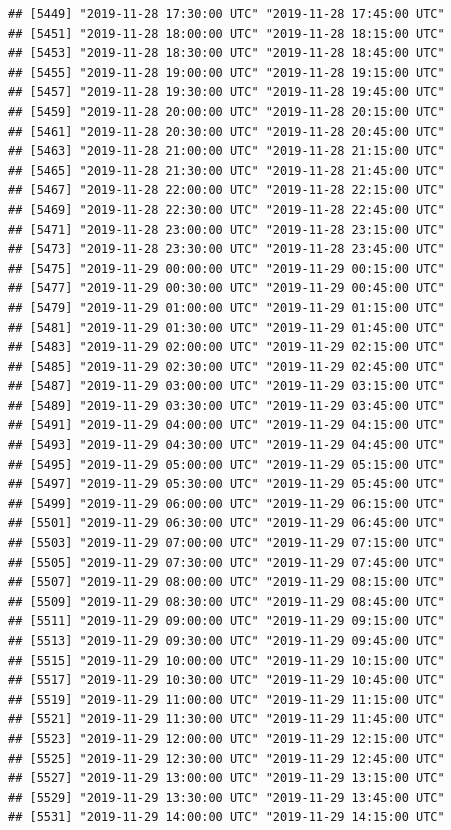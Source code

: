 \documentclass{article}\usepackage[]{graphicx}\usepackage[]{color}
\makeatletter
\newenvironment{kframe}{%
 \def\at@end@of@kframe{}%
 \ifinner\ifhmode%
  \def\at@end@of@kframe{\end{minipage}}%
  \begin{minipage}{\columnwidth}%
 \fi\fi%
 \def\FrameCommand##1{\hskip\@totalleftmargin \hskip-\fboxsep
 \colorbox{shadecolor}{##1}\hskip-\fboxsep
     \hskip-\linewidth \hskip-\@totalleftmargin \hskip\columnwidth}%
 \MakeFramed {\advance\hsize-\width
   \@totalleftmargin\z@ \linewidth\hsize
   \@setminipage}}%
 {\par\unskip\endMakeFramed%
 \at@end@of@kframe}
\newenvironment{knitrout}{}{} %
\makeatother
\begin{document}
\begin{knitrout}
\begin{kframe}
\begin{verbatim}
## [5449] "2019-11-28 17:30:00 UTC" "2019-11-28 17:45:00 UTC"
## [5451] "2019-11-28 18:00:00 UTC" "2019-11-28 18:15:00 UTC"
## [5453] "2019-11-28 18:30:00 UTC" "2019-11-28 18:45:00 UTC"
## [5455] "2019-11-28 19:00:00 UTC" "2019-11-28 19:15:00 UTC"
## [5457] "2019-11-28 19:30:00 UTC" "2019-11-28 19:45:00 UTC"
## [5459] "2019-11-28 20:00:00 UTC" "2019-11-28 20:15:00 UTC"
## [5461] "2019-11-28 20:30:00 UTC" "2019-11-28 20:45:00 UTC"
## [5463] "2019-11-28 21:00:00 UTC" "2019-11-28 21:15:00 UTC"
## [5465] "2019-11-28 21:30:00 UTC" "2019-11-28 21:45:00 UTC"
## [5467] "2019-11-28 22:00:00 UTC" "2019-11-28 22:15:00 UTC"
## [5469] "2019-11-28 22:30:00 UTC" "2019-11-28 22:45:00 UTC"
## [5471] "2019-11-28 23:00:00 UTC" "2019-11-28 23:15:00 UTC"
## [5473] "2019-11-28 23:30:00 UTC" "2019-11-28 23:45:00 UTC"
## [5475] "2019-11-29 00:00:00 UTC" "2019-11-29 00:15:00 UTC"
## [5477] "2019-11-29 00:30:00 UTC" "2019-11-29 00:45:00 UTC"
## [5479] "2019-11-29 01:00:00 UTC" "2019-11-29 01:15:00 UTC"
## [5481] "2019-11-29 01:30:00 UTC" "2019-11-29 01:45:00 UTC"
## [5483] "2019-11-29 02:00:00 UTC" "2019-11-29 02:15:00 UTC"
## [5485] "2019-11-29 02:30:00 UTC" "2019-11-29 02:45:00 UTC"
## [5487] "2019-11-29 03:00:00 UTC" "2019-11-29 03:15:00 UTC"
## [5489] "2019-11-29 03:30:00 UTC" "2019-11-29 03:45:00 UTC"
## [5491] "2019-11-29 04:00:00 UTC" "2019-11-29 04:15:00 UTC"
## [5493] "2019-11-29 04:30:00 UTC" "2019-11-29 04:45:00 UTC"
## [5495] "2019-11-29 05:00:00 UTC" "2019-11-29 05:15:00 UTC"
## [5497] "2019-11-29 05:30:00 UTC" "2019-11-29 05:45:00 UTC"
## [5499] "2019-11-29 06:00:00 UTC" "2019-11-29 06:15:00 UTC"
## [5501] "2019-11-29 06:30:00 UTC" "2019-11-29 06:45:00 UTC"
## [5503] "2019-11-29 07:00:00 UTC" "2019-11-29 07:15:00 UTC"
## [5505] "2019-11-29 07:30:00 UTC" "2019-11-29 07:45:00 UTC"
## [5507] "2019-11-29 08:00:00 UTC" "2019-11-29 08:15:00 UTC"
## [5509] "2019-11-29 08:30:00 UTC" "2019-11-29 08:45:00 UTC"
## [5511] "2019-11-29 09:00:00 UTC" "2019-11-29 09:15:00 UTC"
## [5513] "2019-11-29 09:30:00 UTC" "2019-11-29 09:45:00 UTC"
## [5515] "2019-11-29 10:00:00 UTC" "2019-11-29 10:15:00 UTC"
## [5517] "2019-11-29 10:30:00 UTC" "2019-11-29 10:45:00 UTC"
## [5519] "2019-11-29 11:00:00 UTC" "2019-11-29 11:15:00 UTC"
## [5521] "2019-11-29 11:30:00 UTC" "2019-11-29 11:45:00 UTC"
## [5523] "2019-11-29 12:00:00 UTC" "2019-11-29 12:15:00 UTC"
## [5525] "2019-11-29 12:30:00 UTC" "2019-11-29 12:45:00 UTC"
## [5527] "2019-11-29 13:00:00 UTC" "2019-11-29 13:15:00 UTC"
## [5529] "2019-11-29 13:30:00 UTC" "2019-11-29 13:45:00 UTC"
## [5531] "2019-11-29 14:00:00 UTC" "2019-11-29 14:15:00 UTC"

\end{verbatim}
\end{kframe}
\end{knitrout}
\end{document}
